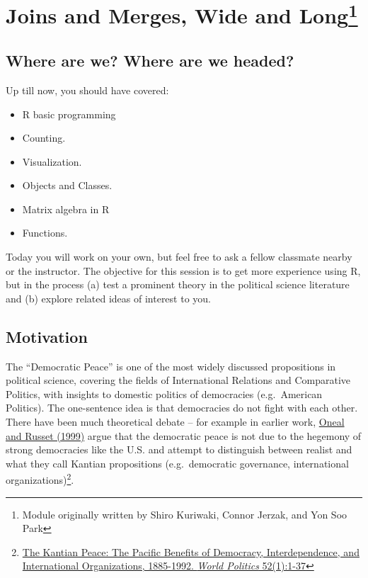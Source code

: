 \documentclass[]{book}
\providecommand{\tightlist}{%
  \setlength{\itemsep}{0pt}\setlength{\parskip}{0pt}}
\let\rmarkdownfootnote\footnote%
\def\footnote{\protect\rmarkdownfootnote}
\theoremstyle{definition}
\theoremstyle{definition}
\theoremstyle{definition}
\theoremstyle{remark}
\begin{document}
\chapter[Joins and Merges, Wide and Long]{\texorpdfstring{Joins and
Merges, Wide and Long\footnote{Module originally written by Shiro
  Kuriwaki, Connor Jerzak, and Yon Soo Park}}{Joins and Merges, Wide and Long}}\label{dempeace}

\section*{Where are we? Where are we
headed?}\label{where-are-we-where-are-we-headed-4}

Up till now, you should have covered:

\begin{itemize}
\tightlist
\item
  R basic programming
\item
  Counting.
\item
  Visualization.
\item
  Objects and Classes.
\item
  Matrix algebra in R
\item
  Functions.
\end{itemize}

Today you will work on your own, but feel free to ask a fellow classmate
nearby or the instructor. The objective for this session is to get more
experience using R, but in the process (a) test a prominent theory in
the political science literature and (b) explore related ideas of
interest to you.

\section{Motivation}\label{motivation-1}

The ``Democratic Peace'' is one of the most widely discussed
propositions in political science, covering the fields of International
Relations and Comparative Politics, with insights to domestic politics
of democracies (e.g.~American Politics). The one-sentence idea is that
democracies do not fight with each other. There have been much
theoretical debate -- for example in earlier work,
\href{https://blackboard.angelo.edu/bbcswebdav/institution/LFA/CSS/Course\%20Material/SEC6302/Readings/Lesson_3/Oneal-Russett.pdf}{Oneal
and Russet (1999)} argue that the democratic peace is not due to the
hegemony of strong democracies like the U.S. and attempt to distinguish
between realist and what they call Kantian propositions (e.g.~democratic
governance, international organizations)\footnote{\href{https://blackboard.angelo.edu/bbcswebdav/institution/LFA/CSS/Course\%20Material/SEC6302/Readings/Lesson_3/Oneal-Russett.pdf}{The
  Kantian Peace: The Pacific Benefits of Democracy, Interdependence, and
  International Organizations, 1885-1992. \emph{World Politics}
  52(1):1-37}}.
\end{document}
